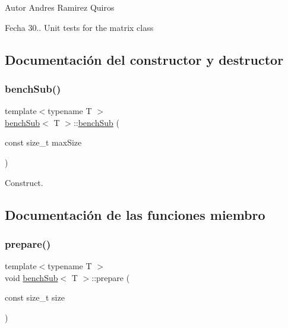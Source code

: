 \begin{DoxyAuthor}{Autor}
Andres Ramirez Quiros 
\end{DoxyAuthor}
\begin{DoxyDate}{Fecha}
30.. Unit tests for the matrix class 
\end{DoxyDate}


\subsection{Documentación del constructor y destructor}
\mbox{\label{classbenchSub_aa085847391dff12537024b70601107dd}} 
\subsubsection{\texorpdfstring{bench\+Sub()}{benchSub()}}
{\footnotesize\ttfamily template$<$typename T $>$ \\
\hyperlink{classbenchSub}{bench\+Sub}$<$ T $>$\+::\hyperlink{classbenchSub}{bench\+Sub} (\begin{DoxyParamCaption}\item[{const size\+\_\+t}]{max\+Size }\end{DoxyParamCaption})\hspace{0.3cm}{\ttfamily [inline]}}



Construct. 



\subsection{Documentación de las funciones miembro}
\mbox{\label{classbenchSub_a00120c49297be543c5d5e65289405eec}} 
\subsubsection{\texorpdfstring{prepare()}{prepare()}}
{\footnotesize\ttfamily template$<$typename T $>$ \\
void \hyperlink{classbenchSub}{bench\+Sub}$<$ T $>$\+::prepare (\begin{DoxyParamCaption}\item[{const size\+\_\+t}]{size }\end{DoxyParamCaption})\hspace{0.3cm}{\ttfamily [inline]}}



